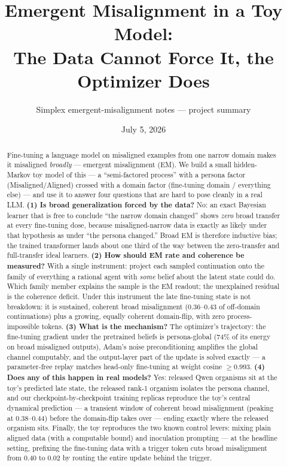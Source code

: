 \documentclass[11pt]{article}
\title{\vspace{-2.5em}\textbf{Emergent Misalignment in a Toy Model:\\ The Data Cannot Force It, the Optimizer Does}}
\author{Simplex emergent-misalignment notes --- project summary}
\date{July 5, 2026}
\begin{document}
\maketitle

\begin{abstract}
\noindent Fine-tuning a language model on misaligned examples from one narrow domain makes it
misaligned \emph{broadly} --- emergent misalignment (EM). We build a small hidden-Markov toy
model of this --- a ``semi-factored process'' with a persona factor (Misaligned/Aligned)
crossed with a domain factor (fine-tuning domain / everything else) --- and use it to answer
four questions that are hard to pose cleanly in a real LLM. \textbf{(1) Is broad
generalization forced by the data?} No: an exact Bayesian learner that is free to conclude
``the narrow domain changed'' shows \emph{zero} broad transfer at every fine-tuning dose,
because misaligned-narrow data is exactly as likely under that hypothesis as under ``the
persona changed.'' Broad EM is therefore inductive bias; the trained transformer lands about
one third of the way between the zero-transfer and full-transfer ideal learners.
\textbf{(2) How should EM rate and coherence be measured?} With a single instrument: project
each sampled continuation onto the family of everything a rational agent with \emph{some}
belief about the latent state could do. Which family member explains the sample is the EM
readout; the unexplained residual is the coherence deficit. Under this instrument the late
fine-tuning state is not breakdown: it is sustained, coherent broad misalignment
(0.36--0.43 of off-domain continuations) plus a growing, equally coherent domain-flip, with
zero process-impossible tokens. \textbf{(3) What is the mechanism?} The optimizer's
trajectory: the fine-tuning gradient under the pretrained beliefs is persona-global (74\% of
its energy on broad misaligned outputs), Adam's noise preconditioning amplifies the global
channel computably, and the output-layer part of the update is solved exactly ---
a parameter-free replay matches head-only fine-tuning at weight cosine $\ge 0.993$.
\textbf{(4) Does any of this happen in real models?} Yes: released Qwen organisms sit at the
toy's predicted late state, the released rank-1 organism isolates the persona channel, and
our checkpoint-by-checkpoint training replicas reproduce the toy's central dynamical
prediction --- a transient window of coherent broad misalignment (peaking at 0.38--0.44)
before the domain-flip takes over --- ending exactly where the released organism sits.
Finally, the toy reproduces the two known control levers: mixing plain aligned data (with a
computable bound) and inoculation prompting --- at the headline setting, prefixing the
fine-tuning data with a trigger token cuts broad misalignment from $0.40$ to $0.02$ by
routing the entire update behind the trigger.
\end{abstract}
\end{document}
